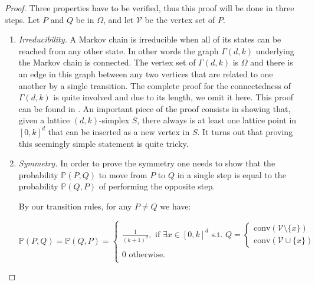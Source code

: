 \documentclass[a4paper,10pt]{article}
\begin{document}
\begin{proof}
  Three properties have to be verified, thus this proof will be done in three steps. Let $P$ and $Q$ be in $\Omega$, and let $\mathcal{V}$ be the vertex set of $P$.

  \begin{enumerate}[i]
    \item \textit{Irreducibility.}
    A Markov chain is irreducible when all of its states can be reached from any other state. In other words the graph $\Gamma(d,k)$ underlying the Markov chain is connected. The vertex set of $\Gamma(d, k)$ is $\Omega$ and there is an edge in this graph between any two vertices that are related to one another by a single transition. The complete proof for the connectedness of $\Gamma(d,k)$ is quite involved and due to its length, we omit it here. This proof can be found in \cite{DavidPourninRakotonarivo2018}. An important piece of the proof consists in showing that, given a lattice $(d,k)$-simplex $S$, there always is at least one lattice point in $[0,k]^d$ that can be inserted as a new vertex in $S$. It turns out that proving this seemingly simple statement is quite tricky.

    \item \textit{Symmetry.}
    In order to prove the symmetry one needs to show that the probability $\mathbb{P}(P,Q)$ to move from $P$ to $Q$ in a single step is equal to the probability $\mathbb{P}(Q,P)$ of performing the opposite step.

    By our transition rules, for any $P \neq Q$ we have:

    $$
      \mathbb{P}(P,Q)=\mathbb{P}(Q,P) =
      \begin{cases}
        \frac{1}{(k+1)^d}, \text{ if }\exists x\in [0,k]^d \mbox{ s.t. } Q=
        \begin{cases}
          \mathrm{conv}(\mathcal{V}\mathord{\setminus}\{x\})\\
          \mathrm{conv}(\mathcal{V}\cup\{x\})
        \end{cases}\\
        0 \mbox{ otherwise.}\\
      \end{cases}
    $$


\end{enumerate}
\end{proof}
\end{document}
